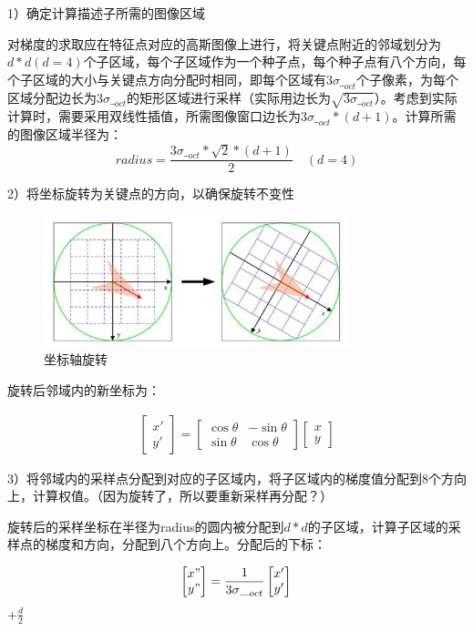 \documentclass[12pt]{article}
\numberwithin{equation}{section}%
\begin{document}
1）确定计算描述子所需的图像区域

对梯度的求取应在特征点对应的高斯图像上进行，将关键点附近的邻域划分为$d*d(d=4)$个子区域，每个子区域作为一个种子点，每个种子点有八个方向，每个子区域的大小与关键点方向分配时相同，即每个区域有$3\sigma\_ _{oct}$个子像素，为每个区域分配边长为$3\sigma\_ _{oct}$的矩形区域进行采样（实际用边长为$\sqrt{3\sigma\_ _{oct}}$）。考虑到实际计算时，需要采用双线性插值，所需图像窗口边长为$3\sigma\_ _{oct}*(d+1)$。计算所需的图像区域半径为：
\begin{equation}
radius=\frac{3\sigma\_ _{oct}*\sqrt{2}*(d+1)}{2} \quad (d=4)
\end{equation}

2）将坐标旋转为关键点的方向，以确保旋转不变性
\begin{figure}
  \centering\includegraphics[width=3.5in]{zuobiaozhouxuanzhuan.png}
  \caption{坐标轴旋转}
 \label{zuobiaoxuanzhuan}
  \end{figure}

旋转后邻域内的新坐标为：

\begin{gather*}
\begin{bmatrix}
x'\\
y'
\end{bmatrix}
=
\begin{bmatrix}
\cos\theta & -\sin\theta \\
\sin\theta & \cos\theta
\end{bmatrix}
\begin{bmatrix}
x\\
y
\end{bmatrix}
\end{gather*}

3）将邻域内的采样点分配到对应的子区域内，将子区域内的梯度值分配到8个方向上，计算权值。（因为旋转了，所以要重新采样再分配？）

旋转后的采样坐标在半径为radius的圆内被分配到$d*d$的子区域，计算子区域的采样点的梯度和方向，分配到八个方向上。分配后的下标：

\begin{gather*}
\begin{bmatrix}
x"\\
y"
\end{bmatrix}
=
\frac{1}{3\sigma\_ _{oct}}
\begin{bmatrix}
x'\\
y'
\end{bmatrix}
\end{gather*}
$+\frac{d}{2}$
\end{document}

